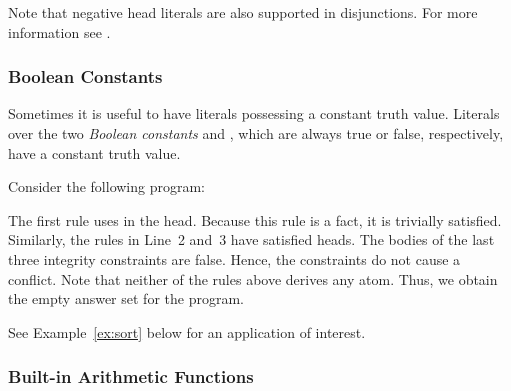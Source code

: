 \begin{note}
  Note that negative head literals are also supported in disjunctions.
  For more information see \cite{litatu99a}.
\end{note}

\subsubsection{Boolean Constants}
%
Sometimes it is useful to have literals possessing a constant truth value.
Literals over the two \emph{Boolean constants}  and ,
which are always true or false, respectively,
have a constant truth value.

\begin{example}
Consider the following program:
%

The first rule uses  in the head.
Because this rule is a fact, it is trivially satisfied.
Similarly, the rules in Line~2 and~3 have satisfied heads.
The bodies of the last three integrity constraints are false.
Hence, the constraints do not cause a conflict.
Note that neither of the rules above derives any atom.
Thus, we obtain the empty answer set for the program.
\end{example}
See Example~\ref{ex:sort} below for an application of interest.
\subsubsection{Built-in Arithmetic Functions}\label{subsec:gringo:arith}


